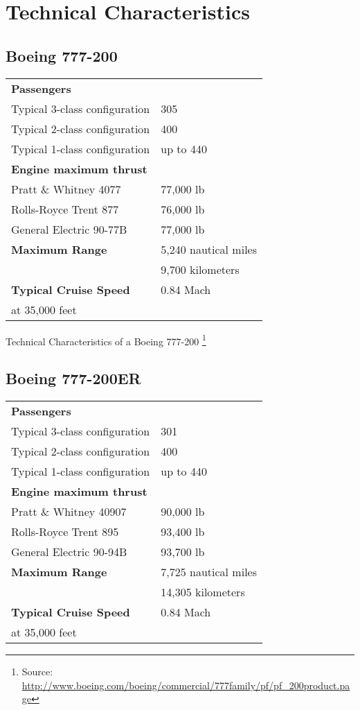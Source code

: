 \section{Technical Characteristics}

\subsection{Boeing 777-200}
\begin{tabular}{l l}
\textbf{Passengers} & \\
Typical 3-class configuration & 305 \\
Typical 2-class configuration & 400 \\
Typical 1-class configuration & up to 440 \\
\hline
\textbf{Engine maximum thrust} & \\
Pratt \& Whitney 4077 & 77,000 lb \\
Rolls-Royce Trent 877 & 76,000 lb \\
General Electric 90-77B & 77,000 lb \\
\hline
\textbf{Maximum Range} & 5,240 nautical miles \\
& 9,700 kilometers\\
\hline
\textbf {Typical Cruise Speed} & 0.84 Mach \\
at 35,000 feet & \\
\end{tabular}

Technical Characteristics of a Boeing 777-200 \footnote{Source: \url{http://www.boeing.com/boeing/commercial/777family/pf/pf_200product.page}}

\subsection{Boeing 777-200ER}
\begin{tabular}{l l}
\textbf{Passengers} & \\
Typical 3-class configuration & 301 \\
Typical 2-class configuration & 400 \\
Typical 1-class configuration & up to 440 \\
\hline
\textbf{Engine maximum thrust} & \\
Pratt \& Whitney 40907 & 90,000 lb \\
Rolls-Royce Trent 895 & 93,400 lb \\
General Electric 90-94B & 93,700 lb \\
\hline
\textbf{Maximum Range} & 7,725 nautical miles \\
& 14,305 kilometers\\
\hline
\textbf {Typical Cruise Speed} & 0.84 Mach \\
at 35,000 feet & \\
\end{tabular}

